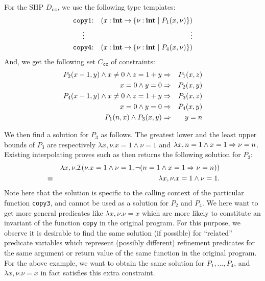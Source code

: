 For the SHP \(D_{\texttt{cc}}\), we use the following type templates:
\begin{eqnarray*}
\texttt{copy1}&\mathbin{:}&(x\mathbin{:}{\mathbf{int}}\mathbin{\rightarrow}{\{{\nu\mathbin{:}\mathbf{int} \mid P_1(x,\nu)}\}}) \\
\vdots\quad &&\qquad\qquad \vdots \\
\texttt{copy4}&\mathbin{:}&(x\mathbin{:}{\mathbf{int}}\mathbin{\rightarrow}{\{{\nu\mathbin{:}\mathbf{int} \mid P_4(x,\nu)}\}})
\end{eqnarray*}
And, we get the following set \(C_{\texttt{cc}}\) of constraints:
\begin{eqnarray*}
P_2(x-1,y) \land x\neq0 \land z=1+y &\Rightarrow& P_1(x,z) \\
x=0 \land y=0 &\Rightarrow& P_2(x,y) \\
P_4(x-1,y) \land x\neq0 \land z=1+y &\Rightarrow& P_3(x,z) \\
x=0 \land y=0 &\Rightarrow& P_4(x,y) \\
P_1(n,x) \land P_3(x,y) &\Rightarrow& y=n
\end{eqnarray*}

We then find a solution for \(P_3\) as follows.  The greatest lower and 
the least upper bounds of \(P_3\) are respectively \(\lambda x,\nu.x=1 
\land \nu=1\) and \(\lambda x,n=1 \land x=1 \Rightarrow \nu=n\).  Existing 
interpolating proves such as \cite{Beyer2008} then returns the following 
solution for \(P_3\):
\begin{eqnarray*}
&&\lambda x,\nu.\mathcal{I}(\nu.x=1 \land \nu=1,\neg (n=1 \land x=1 \Rightarrow \nu=n)) \\
&\equiv& \lambda x,\nu.x=1 \land \nu=1.
\end{eqnarray*}
Note here that the solution is specific to the calling context of the 
particular function \texttt{copy3}, and cannot be used as a solution for 
\(P_2\) and \(P_4\).  We here want to get more general predicates like 
\(\lambda x,\nu.\nu=x\) which are more likely to constitute an invariant 
of the function \texttt{copy} in the original program.  For this purpose, 
we observe it is desirable to find the same solution (if possible) for 
``related'' predicate variables which represent (possibly different) 
refinement predicates for the same argument or return value of the same 
function in the original program.  For the above example, we want to 
obtain the same solution for \(P_1,\dots,P_4\), and \(\lambda 
x,\nu.\nu=x\) in fact satisfies this extra constraint.

